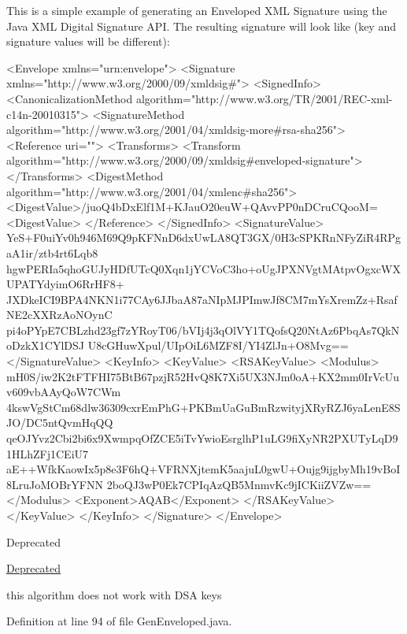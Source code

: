 This is a simple example of generating an Enveloped X\-M\-L Signature using the Java X\-M\-L Digital Signature A\-P\-I. The resulting signature will look like (key and signature values will be different)\-:


\begin{DoxyPre}
 {\ttfamily 
<Envelope xmlns="urn:envelope">
 <Signature xmlns="http://www.w3.org/2000/09/xmldsig#">
   <SignedInfo>
     <CanonicalizationMethod algorithm="http://www.w3.org/TR/2001/REC-xml-c14n-20010315">
     <SignatureMethod algorithm="http://www.w3.org/2001/04/xmldsig-more#rsa-sha256">
     <Reference uri="">
       <Transforms>
         <Transform algorithm="http://www.w3.org/2000/09/xmldsig#enveloped-signature">
       </Transforms>
       <DigestMethod algorithm="http://www.w3.org/2001/04/xmlenc#sha256">
       <DigestValue>/juoQ4bDxElf1M+KJauO20euW+QAvvPP0nDCruCQooM=<DigestValue>
     </Reference>
   </SignedInfo>
   <SignatureValue>
     YeS+F0uiYv0h946M69Q9pKFNnD6dxUwLA8QT3GX/0H3cSPKRnNFyZiR4RPgaA1ir/ztb4rt6Lqb8
     hgwPERIa5qhoGUJyHDfUTcQ0Xqn1jYCVoC3ho+oUgJPXNVgtMAtpvOgxcWXUPATYdyimO6RrHF8+
     JXDkeICI9BPA4NKN1i77CAy6JJbaA87aNIpMJPImwJf8CM7mYsXremZz+RsafNE2cXXRzAoNOynC
     pi4oPYpE7CBLzhd23gf7zYRoyT06/bVIj4j3qOlVY1TQofsQ20NtAz6PbqAs7QkNoDzkX1CYlDSJ
     U8cGHuwXpul/UIpOiL6MZF8I/YI4ZlJn+O8Mvg==
   </SignatureValue>
   <KeyInfo>
     <KeyValue>
       <RSAKeyValue>
         <Modulus>
           mH0S/iw2K2tFTFHI75BtB67pzjR52HvQ8K7Xi5UX3NJm0oA+KX2mm0IrVcUuv609vbAAyQoW7CWm
           4kswVgStCm68dlw36309cxrEmPhG+PKBmUaGuBmRzwityjXRyRZJ6yaLenE8SJO/DC5ntQvmHqQQ
           qeOJYvz2Cbi2bi6x9XwmpqOfZCE5iTvYwioEsrglhP1uLG9fiXyNR2PXUTyLqD91HLhZFj1CEiU7
           aE++WfkKaowIx5p8e3F6hQ+VFRNXjtemK5aajuL0gwU+Oujg9ijgbyMh19vBoI8LruJoMOBrYFNN
           2boQJ3wP0Ek7CPIqAzQB5MnmvKc9jICKiiZVZw==
         </Modulus>
         <Exponent>AQAB</Exponent>
       </RSAKeyValue>
     </KeyValue>
   </KeyInfo>
 </Signature>
</Envelope>
 }
 \end{DoxyPre}


\begin{DoxyRefDesc}{Deprecated}
\item[\hyperlink{deprecated__deprecated000017}{Deprecated}]
\begin{DoxyItemize}
\item this algorithm does not work with D\-S\-A keys 
\end{DoxyItemize}\end{DoxyRefDesc}


Definition at line 94 of file Gen\-Enveloped.\-java.



